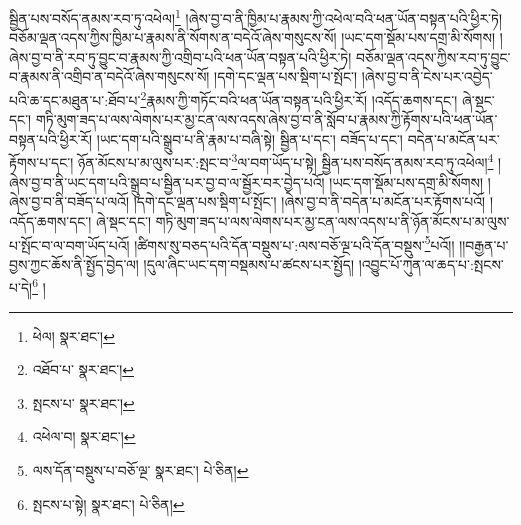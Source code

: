 སྦྱིན་པས་བསོད་ནམས་རབ་ཏུ་འཕེལ།\footnote{ཕེལ།  སྣར་ཐང་། } །ཞེས་བྱ་བ་ནི་ཁྱིམ་པ་རྣམས་ཀྱི་འཕེལ་བའི་ཕན་ཡོན་བསྟན་པའི་ཕྱིར་ཏེ། བཅོམ་ལྡན་འདས་ཀྱིས་ཁྱིམ་པ་རྣམས་ནི་སོགས་ན་བདེའོ་ཞེས་གསུངས་སོ། །ཡང་དག་སྡོམ་པས་དགྲ་མི་སོགས། །ཞེས་བྱ་བ་ནི་རབ་ཏུ་བྱུང་བ་རྣམས་ཀྱི་འགྲིབ་པའི་ཕན་ཡོན་བསྟན་པའི་ཕྱིར་ཏེ། བཅོམ་ལྡན་འདས་ཀྱིས་རབ་ཏུ་བྱུང་བ་རྣམས་ནི་འགྲིབ་ན་བདེའོ་ཞེས་གསུངས་སོ། །དགེ་དང་ལྡན་པས་སྡིག་པ་སྤོང་། །ཞེས་བྱ་བ་ནི་ངེས་པར་འབྱེད་པའི་ཆ་དང་མཐུན་པ་:ཐོབ་པ་\footnote{འཐོབ་པ་  སྣར་ཐང་། }རྣམས་ཀྱི་གཏོང་བའི་ཕན་ཡོན་བསྟན་པའི་ཕྱིར་རོ། །འདོད་ཆགས་དང་། ཞེ་སྡང་དང་། གཏི་མུག་ཟད་པ་ལས་ལེགས་པར་མྱ་ངན་ལས་འདས་ཞེས་བྱ་བ་ནི་སློབ་པ་རྣམས་ཀྱི་རྟོགས་པའི་ཕན་ཡོན་བསྟན་པའི་ཕྱིར་རོ། །ཡང་དག་པའི་སྒྲུབ་པ་ནི་རྣམ་པ་བཞི་སྟེ། སྦྱིན་པ་དང་། བཟོད་པ་དང་། བདེན་པ་མངོན་པར་རྟོགས་པ་དང་། ཉོན་མོངས་པ་མ་ལུས་པར་:སྤང་བ་\footnote{སྤངས་པ་  སྣར་ཐང་། }ལ་བག་ཡོད་པ་སྟེ། སྦྱིན་པས་བསོད་ནམས་རབ་ཏུ་འཕེལ།\footnote{འཕེལ་བ།  སྣར་ཐང་། } །ཞེས་བྱ་བ་ནི་ཡང་དག་པའི་སྒྲུབ་པ་སྦྱིན་པར་བྱ་བ་ལ་སྦྱོར་བར་བྱེད་པའོ། །ཡང་དག་སྡོམ་པས་དགྲ་མི་སོགས། །ཞེས་བྱ་བ་ནི་བཟོད་པ་ལའོ། །དགེ་དང་ལྡན་པས་སྡིག་པ་སྤོང་། །ཞེས་བྱ་བ་ནི་བདེན་པ་མངོན་པར་རྟོགས་པའོ། །འདོད་ཆགས་དང་། ཞེ་སྡང་དང་། གཏི་མུག་ཟད་པ་ལས་ལེགས་པར་མྱ་ངན་ལས་འདས་པ་ནི་ཉོན་མོངས་པ་མ་ལུས་པ་སྤོང་བ་ལ་བག་ཡོད་པའོ། །ཚིགས་སུ་བཅད་པའི་དོན་བསྡུས་པ་:ལས་བཅོ་ལྔ་པའི་དོན་བསྡུས་\footnote{ལས་དོན་བསྡུས་པ་བཅོ་ལྔ་  སྣར་ཐང་།  པེ་ཅིན། }པའོ།། །།བརྒྱན་པ་བྱས་ཀྱང་ཆོས་ནི་སྤྱོད་བྱེད་ལ། །དུལ་ཞིང་ཡང་དག་བསྡམས་པ་ཚངས་པར་སྤྱོད། །འབྱུང་པོ་ཀུན་ལ་ཆད་པ་:སྤངས་པ་དེ།\footnote{སྤངས་པ་སྟེ།  སྣར་ཐང་།  པེ་ཅིན། } །
